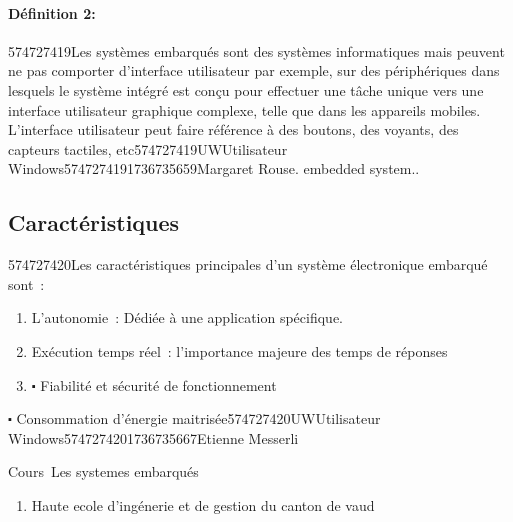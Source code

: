\documentclass[12pt,a4paper]{report}
\begin{document}
\begin{flushleft}
	\paragraph{D\'{e}finition 2:}
	
	\noindent 574727419Les syst\`{e}mes embarqu\'{e}s sont des syst\`{e}mes informatiques mais peuvent ne pas comporter d'interface utilisateur par exemple, sur des p\'{e}riph\'{e}riques dans lesquels le syst\`{e}me int\'{e}gr\'{e} est con\c{c}u pour effectuer une t\^{a}che unique vers une interface utilisateur graphique complexe, telle que dans les appareils mobiles. L'interface utilisateur peut faire r\'{e}f\'{e}rence \`{a} des boutons, des voyants, des capteurs tactiles, etc574727419UWUtilisateur Windows5747274191736735659Margaret Rouse. embedded system.. 
	
	\noindent 
	
	\subsection{Caract\'{e}ristiques}
	
	\noindent 574727420Les caract\'{e}ristiques principales d'un syst\`{e}me \'{e}lectronique embarqu\'{e} sont~:
\end{flushleft}

\begin{enumerate}
	\item  L'autonomie~: D\'{e}di\'{e}e \`{a} une application sp\'{e}cifique.
	
	\item  Ex\'{e}cution temps r\'{e}el~: l'importance majeure des temps de r\'{e}ponses 
	
	\item  $\mathrm{\centerdot}$ Fiabilit\'{e} et s\'{e}curit\'{e} de fonctionnement
\end{enumerate}

\begin{flushleft}
	$\mathrm{\centerdot}$ Consommation d'\'{e}nergie maitris\'{e}e574727420UWUtilisateur Windows5747274201736735667Etienne Messerli
	
	\noindent Cours~Les systemes embarqu\'{e}s
\end{flushleft}

\noindent \begin{enumerate}
	\item Haute ecole d'ing\'{e}nerie et de gestion du canton de vaud
\end{enumerate}
\end{document}
